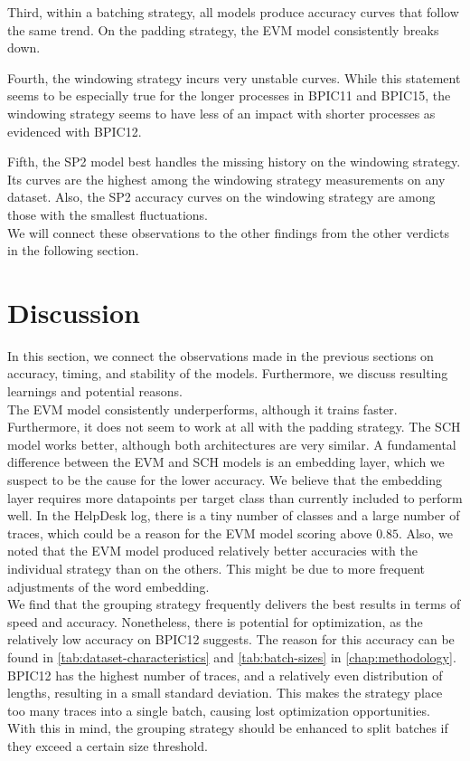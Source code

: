 Third, within a batching strategy, all models produce accuracy curves that follow the same trend.
On the padding strategy, the EVM model consistently breaks down.

Fourth, the windowing strategy incurs very unstable curves.
While this statement seems to be especially true for the longer processes in BPIC11 and BPIC15, the windowing strategy seems to have less of an impact with shorter processes as evidenced with BPIC12.

Fifth, the SP2 model best handles the missing history on the windowing strategy.
Its curves are the highest among the windowing strategy measurements on any dataset.
Also, the SP2 accuracy curves on the windowing strategy are among those with the smallest fluctuations.\\

We will connect these observations to the other findings from the other verdicts in the following section.

\section{Discussion}\label{sec:eval:discussion}
In this section, we connect the observations made in the previous sections on accuracy, timing, and stability of the models.
Furthermore, we discuss resulting learnings and potential reasons.\\

The EVM model consistently underperforms, although it trains faster.
Furthermore, it does not seem to work at all with the padding strategy.
The SCH model works better, although both architectures are very similar.
A fundamental difference between the EVM and SCH models is an embedding layer, which we suspect to be the cause for the lower accuracy.
We believe that the embedding layer requires more datapoints per target class than currently included to perform well.
In the HelpDesk log, there is a tiny number of classes and a large number of traces, which could be a reason for the EVM model scoring above $0.85$.
Also, we noted that the EVM model produced relatively better accuracies with the individual strategy than on the others.
This might be due to more frequent adjustments of the word embedding.\\

We find that the grouping strategy frequently delivers the best results in terms of speed and accuracy.
Nonetheless, there is potential for optimization, as the relatively low accuracy on BPIC12 suggests.
The reason for this accuracy can be found in \autoref{tab:dataset-characteristics} and \autoref{tab:batch-sizes} in \autoref{chap:methodology}.
BPIC12 has the highest number of traces, and a relatively even distribution of lengths, resulting in a small standard deviation.
This makes the strategy place too many traces into a single batch, causing lost optimization opportunities.
With this in mind, the grouping strategy should be enhanced to split batches if they exceed a certain size threshold.\\

